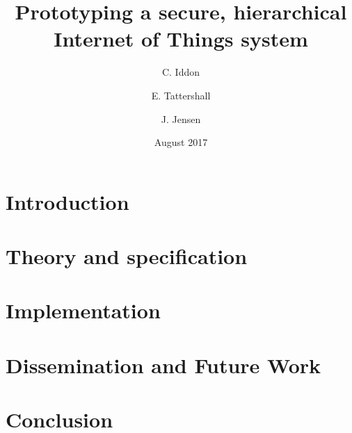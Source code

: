 \documentclass{article}
\title{Prototyping a secure, hierarchical Internet of Things system}
\author{
  C. Iddon
  \and
  E. Tattershall
  \and
  J. Jensen
}
\date{August 2017}
\begin{document}
\maketitle

\section{Introduction}


\section{Theory and specification}


\section{Implementation}


\section{Dissemination and Future Work}


\section{Conclusion}

\end{document}
